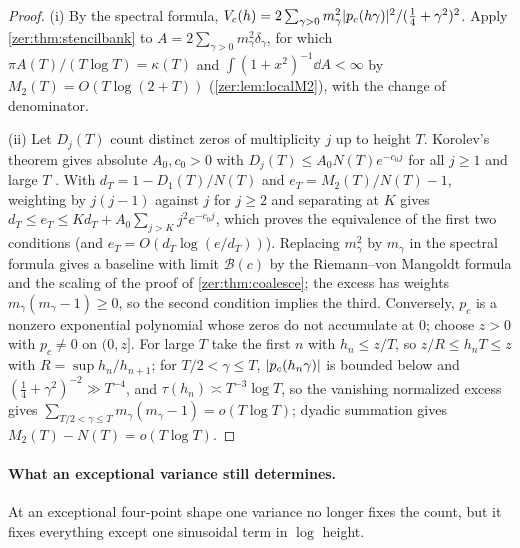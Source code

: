 \begin{proof}
(i) By the spectral formula, $V_c(h)=2\sum_{\gamma>0}m_\gamma^2\lvert p_c(h\gamma)\rvert^2/(\tfrac14+\gamma^2)^2$. Apply
\cref{zer:thm:stencilbank} to $A=2\sum_{\gamma>0}m_\gamma^2\delta_\gamma$, for which $\pi A(T)/(T\log T)=\kappa(T)$
and $\int(1+x^2)^{-1}\dd A<\infty$ by $M_2(T)=O(T\log(2+T))$ (\cref{zer:lem:localM2}), with the change of
denominator.

(ii) Let $D_j(T)$ count distinct zeros of multiplicity $j$ up to height $T$. Korolev's theorem gives
absolute $A_0,c_0>0$ with $D_j(T)\le A_0N(T)e^{-c_0j}$ for all $j\ge1$ and large $T$
\cite[Theorem~A]{Korolev2006Multiple}. With $d_T=1-D_1(T)/N(T)$ and $e_T=M_2(T)/N(T)-1$, weighting by
$j(j-1)$ against $j$ for $j\ge2$ and separating at $K$ gives
$d_T\le e_T\le Kd_T+A_0\sum_{j>K}j^2e^{-c_0j}$, which proves the equivalence of the first two
conditions (and $e_T=O(d_T\log(e/d_T))$). Replacing $m_\gamma^2$ by $m_\gamma$ in the spectral formula gives a
baseline with limit $\mathcal B(c)$ by the Riemann--von Mangoldt formula and the scaling of the proof
of \cref{zer:thm:coalesce}; the excess has weights $m_\gamma(m_\gamma-1)\ge0$, so the second condition
implies the third. Conversely, $p_c$ is a nonzero exponential polynomial whose
zeros do not accumulate at $0$; choose $z>0$ with $p_c\ne0$ on $(0,z]$. For large $T$ take the first
$n$ with $h_n\le z/T$, so $z/R\le h_nT\le z$ with $R=\sup h_n/h_{n+1}$; for $T/2<\gamma\le T$, $\lvert p_c(h_n\gamma)\rvert$
is bounded below and $(\tfrac14+\gamma^2)^{-2}\gg T^{-4}$, and $\tau(h_n)\asymp T^{-3}\log T$, so the vanishing
normalized excess gives $\sum_{T/2<\gamma\le T}m_\gamma(m_\gamma-1)=o(T\log T)$; dyadic summation gives
$M_2(T)-N(T)=o(T\log T)$.
\end{proof}

\paragraph{What an exceptional variance still determines.}
At an exceptional four-point shape one variance no longer fixes the count, but it fixes everything
except one sinusoidal term in $\log$ height.

